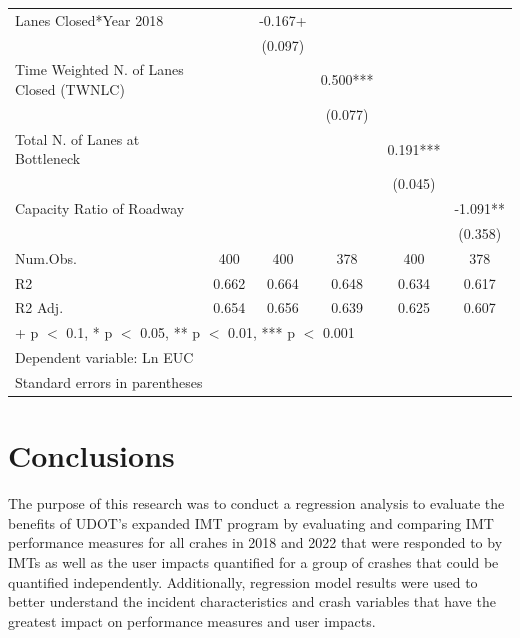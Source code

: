 \documentclass[
  letterpaper,
  authoryear]{elsarticle}
\begin{document}
\begin{table}
{\begin{tabular}[t]{lccccc}
Lanes Closed*Year 2018 &  & -0.167+ &  &  & \\
 &  & (0.097) &  &  & \\
Time Weighted N. of Lanes Closed (TWNLC) &  &  & 0.500*** &  & \\
 &  &  & (0.077) &  & \\
Total N. of Lanes at Bottleneck &  &  &  & 0.191*** & \\
 &  &  &  & (0.045) & \\
Capacity Ratio of Roadway &  &  &  &  & -1.091**\\
 &  &  &  &  & (0.358)\\
\midrule
Num.Obs. & 400 & 400 & 378 & 400 & 378\\
R2 & 0.662 & 0.664 & 0.648 & 0.634 & 0.617\\
R2 Adj. & 0.654 & 0.656 & 0.639 & 0.625 & 0.607\\
\bottomrule
\multicolumn{6}{l}{\rule{0pt}{1em}+ p $<$ 0.1, * p $<$ 0.05, ** p $<$ 0.01, *** p $<$ 0.001}\\
\multicolumn{6}{l}{\rule{0pt}{1em}Dependent variable: Ln EUC}\\
\multicolumn{6}{l}{\rule{0pt}{1em}Standard errors in parentheses}\\
\end{tabular}

}

\end{table}%


\section{Conclusions}\label{conclusions}

The purpose of this research was to conduct a regression analysis to
evaluate the benefits of UDOT's expanded IMT program by evaluating and
comparing IMT performance measures for all crahes in 2018 and 2022 that
were responded to by IMTs as well as the user impacts quantified for a
group of crashes that could be quantified independently. Additionally,
regression model results were used to better understand the incident
characteristics and crash variables that have the greatest impact on
performance measures and user impacts.
\end{document}
